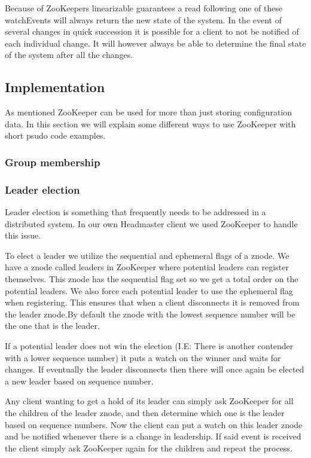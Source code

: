 Because of ZooKeepers linearizable guarantees a read following one of these watchEvents will always return the new state of the system. In the event of several changes in quick succession it is possible for a client to not be notified of each individual change. It will however always be able to determine the final state of the system after all the changes.

\subsection{Implementation}

As mentioned ZooKeeper can be used for more than just storing configuration data. In this section we will explain some different ways to use ZooKeeper with short psudo code examples. 

\subsubsection{Group membership}


\subsubsection{Leader election}
Leader election is something that frequently needs to be addressed in a distributed system. In our own Headmaster client we used ZooKeeper to handle this issue. 

To elect a leader we utilize the sequential and ephemeral flags of a znode. We have a znode called leaders in ZooKeeper where potential leaders can register themselves. This znode has the sequential flag set so we get a total order on the potential leaders. We also force each potential leader to use the ephemeral flag when registering. This ensures that when a client disconnects it is removed from the leader znode.By default the znode with the lowest sequence number will be the one that is the leader.

If a potential leader does not win the election (I.E: There is another contender with a lower sequence number) it puts a watch on the winner and waits for changes. If eventually the leader disconnects then there will once again be elected a new leader based on sequence number.

Any client wanting to get a hold of its leader can simply ask ZooKeeper for all the children of the leader znode, and then determine which one is the leader based on sequence numbers. Now the client can put a watch on this leader znode and be notified whenever there is a change in leadership. If said event is received the client simply ask ZooKeeper again for the children and repeat the process.

